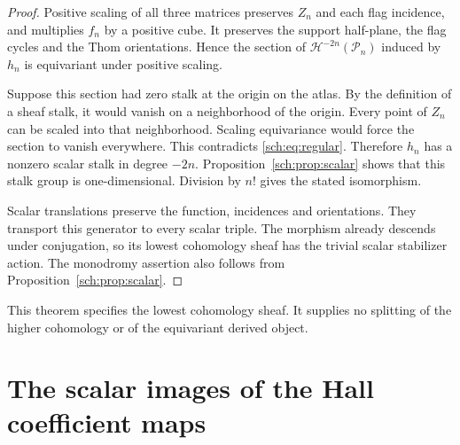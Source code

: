 \begin{proof}
Positive scaling of all three matrices preserves $Z_n$ and each
flag incidence, and multiplies $f_n$ by a positive cube.
It preserves the support half-plane, the flag cycles and the Thom
orientations. Hence the section of $\mathcal H^{-2n}(\mathcal P_n)$
induced by $h_n$ is equivariant under positive scaling.

Suppose this section had zero stalk at the origin on the atlas.
By the definition of a sheaf stalk, it would vanish on a neighborhood
of the origin. Every point of $Z_n$ can be scaled into that neighborhood.
Scaling equivariance would force the section to vanish everywhere.
This contradicts \eqref{sch:eq:regular}. Therefore $h_n$ has a
nonzero scalar stalk in degree $-2n$.
Proposition~\ref{sch:prop:scalar} shows that this stalk group is
one-dimensional. Division by $n!$ gives the stated isomorphism.

Scalar translations preserve the function, incidences and orientations.
They transport this generator to every scalar triple.
The morphism already descends under conjugation, so its lowest
cohomology sheaf has the trivial scalar stabilizer action.
The monodromy assertion also follows from
Proposition~\ref{sch:prop:scalar}.
\end{proof}

This theorem specifies the lowest cohomology sheaf. It supplies no
splitting of the higher cohomology or of the equivariant derived object.

\section{The scalar images of the Hall coefficient maps}
\label{sch:sec:images}

